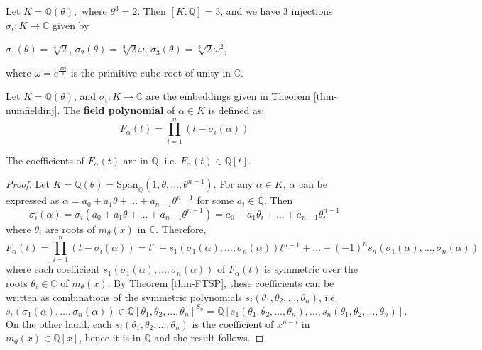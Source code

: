 \begin{example}
Let $K = \mathbb{Q}(\theta), \text{ where } \theta^3 = 2$. Then $[K : \mathbb{Q}] = 3$, and we have $3$ injections $\sigma_i: K \to \mathbb{C}$ given by 
\begin{center}
$\sigma_1(\theta) = \sqrt[3]{2}$, \quad $\sigma_2(\theta) = \sqrt[3]{2}\omega$, \quad $\sigma_3(\theta) = \sqrt[3]{2}\omega^2$,    
\end{center}
 where $\omega = e^{\frac{2\pi i}{3}}$ is the primitive cube root of unity in $\mathbb{C}$.
\end{example}


\begin{definition} \label{def-fieldpoly} Let $K = \mathbb{Q}(\theta)$, and $\sigma_i: K \to \mathbb{C}$ are the embeddings given in Theorem \ref{thm-numfieldinj}. The {\bf field polynomial} of $\alpha \in K$ is
defined as:
\[
F_{\alpha}(t) = \prod_{i=1}^n (t - \sigma_i(\alpha))
\]
\end{definition}

\begin{theorem} \label{thm-fieldpoly} The coefficients of $F_{\alpha}(t)$ are in $\mathbb{Q}$, i.e. $F_{\alpha}(t) \in \mathbb{Q}[t]$.
\end{theorem}

\begin{proof} Let $K = \mathbb{Q}(\theta) = \mathrm{Span}_{\mathbb{Q}}(1,\theta,\dots,\theta^{n-1})$. For any $\alpha \in K$, $\alpha$ can be expressed as $\alpha = a_0 + a_1\theta + \dots + a_{n-1}\theta^{n-1}$ for some $a_i \in \mathbb{Q}$. Then
\[
\sigma_i(\alpha) = \sigma_i(a_0 + a_1\theta + \dots + a_{n-1}\theta^{n-1}) = a_0 + a_1\theta_i + \dots + a_{n-1}\theta_i^{n-1}
\]
where $\theta_i$ are roots of $m_{\theta}(x)$ in $\mathbb{C}$.
Therefore,
\[
F_{\alpha}(t) = \prod_{i=1}^n (t - \sigma_i(\alpha))
= t^n - s_1(\sigma_1(\alpha), \dots, \sigma_n(\alpha))t^{n-1} + \dots + (-1)^n s_n(\sigma_1(\alpha), \dots, \sigma_n(\alpha))
\]
where each coefficient $s_1(\sigma_1(\alpha), \dots, \sigma_n(\alpha))$ of $F_{\alpha}(t)$ is symmetric over the roots $\theta_i \in \mathbb{C}$ of $m_{\theta}(x)$. By Theorem \ref{thm-FTSP}, these coefficients can be written as combinations of the symmetric polynomials $s_i(\theta_1, \theta_2, \dots, \theta_n)$, i.e.
$$s_i(\sigma_1(\alpha), \dots, \sigma_n(\alpha)) \in \mathbb{Q}[\theta_1, \theta_2, \dots, \theta_n]^{S_n} = \mathbb{Q}[s_1(\theta_1, \theta_2, \dots, \theta_n), \dots, s_n(\theta_1, \theta_2, \dots, \theta_n)].$$
On the other hand, each $s_i(\theta_1, \theta_2, \dots, \theta_n)$ is the coefficient of $x^{n-i}$ in $m_{\theta}(x) \in \mathbb{Q}[x]$, hence it is in  $\mathbb{Q}$ and the result follows.
\end{proof}

